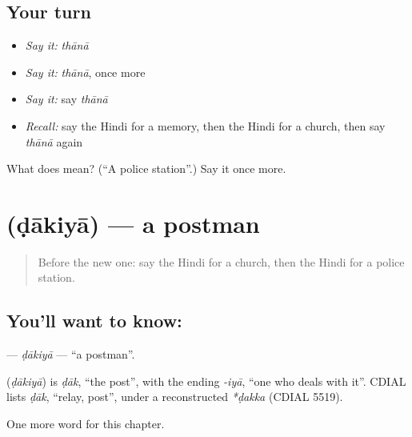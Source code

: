 \subsection*{Your turn}
\begin{itemize}
\raggedright
  \item \emph{Say it:} \emph{thānā}
  \item \emph{Say it:} \emph{thānā}, once more
  \item \emph{Say it:} say \emph{thānā}
  \item \emph{Recall:} say the Hindi for a memory, then the Hindi for a church, then say \emph{thānā} again
\end{itemize}

\begin{tcolorbox}[breakable,colback=teal!4,colframe=teal!35!black,title={Before you move on}]
What does  mean? (\textquotedblleft{}A police station\textquotedblright{}.) Say it once more.
\end{tcolorbox}
\section[\texorpdfstring{\hi{डाकिया} (ḍākiyā)}{डाकिया (ḍākiyā)}]{ (ḍākiyā) — a postman}

\label{lesson:HI-C187-dakiya}



\begin{quote}
Before the new one: say the Hindi for a church, then the Hindi for a police station.
\end{quote}

\subsection*{You'll want to know: }
\textbf{} — \emph{ḍākiyā} — \textquotedblleft{}a postman\textquotedblright{}.

\begin{cousinweb}
\textbf{} (\emph{ḍākiyā}) is \emph{ḍāk}, \textquotedblleft{}the post\textquotedblright{}, with the ending \emph{-iyā}, \textquotedblleft{}one who deals with it\textquotedblright{}. CDIAL lists \emph{ḍāk}, \textquotedblleft{}relay, post\textquotedblright{}, under a reconstructed \emph{*ḍakka} (CDIAL 5519).
\end{cousinweb}

\begin{grammarlens}[title={What you've built}]
One more word for this chapter.
\end{grammarlens}

